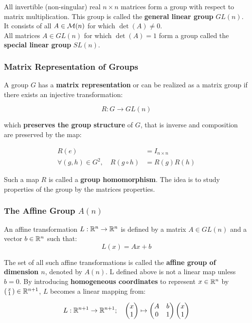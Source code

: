 \noindent
All invertible (non-singular) real $n \times n$ matrices
form a group with respect to matrix multiplication.
This group is called the \textbf{general linear group} $GL(n)$.
It consists of all $A \in \mathcal{M}(n)$ for which $\det(A) \ne 0$.\\

\noindent
All matrices $A \in GL(n)$ for which $\det(A) = 1$ form a group
called the \textbf{special linear group} $SL(n)$.


\subsubsection{Matrix Representation of Groups}
\label{ssub:matrix_representation_of_groups}

A group $G$ has a \textbf{matrix representation} or can be realized as
a matrix group if there exists an injective transformation:

\[R : G \rightarrow GL(n)\]

\noindent
which \textbf{preserves the group structure} of $G$,
that is inverse and composition are preserved by the map:

\begin{align*}
	R(e) &= I_{n \times n} \\
	\forall (g,h) \in G^2, \quad R(g\circ h) &= R(g)R(h)
\end{align*}

\noindent
Such a map $R$ is called a \textbf{group homomorphism}.
The idea is to study properties of the group by the matrices properties.


\subsubsection{The Affine Group $A(n)$}
\label{ssub:the_affine_group_a_n_}

An affine transformation $L : \mathbb{R}^n \rightarrow \mathbb{R}^n$
is defined by a matrix $A \in GL(n)$ and a vector $b \in \mathbb{R}^n$ such that:
\[L(x) = Ax + b\]

\noindent
The set of all such affine transformations is called the
\textbf{affine group of dimension $n$}, denoted by $A(n)$.
L defined above is not a linear map unless $b=0$.
By introducing \textbf{homogeneous coordinates} to represent $x \in \mathbb{R}^n$ by
$\left(\begin{smallmatrix} x \\ 1 \end{smallmatrix} \right) \in \mathbb{R}^{n+1}$,
$L$ becomes a linear mapping from:

\[L: \mathbb{R}^{n+1} \rightarrow \mathbb{R}^{n+1}; \quad
	\begin{pmatrix}
		x \\
		1 \\
	\end{pmatrix}
	\mapsto
	\begin{pmatrix}
		A & b \\
		0 & 1 \\
	\end{pmatrix}
	\begin{pmatrix}
		x \\
		1 \\
	\end{pmatrix}\]

